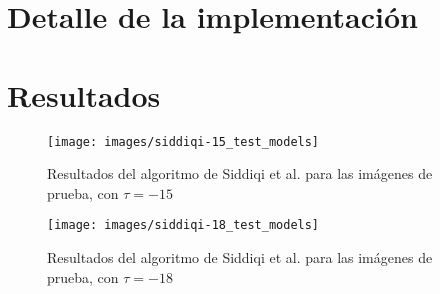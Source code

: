 \section{Detalle de la implementación}

\section{Resultados}

\begin{figure}[ht]\centering
\texttt{[image: images/siddiqi-15\_test\_models]}
\caption{Resultados del algoritmo de Siddiqi et al. para las imágenes de prueba, con $\tau = -15$}
\label{fig:siddiqi-15_test_models}
\end{figure}

\begin{figure}[ht]\centering
\texttt{[image: images/siddiqi-18\_test\_models]}
\caption{Resultados del algoritmo de Siddiqi et al. para las imágenes de prueba, con $\tau = -18$}
\label{fig:siddiqi-18_test_models}
\end{figure}